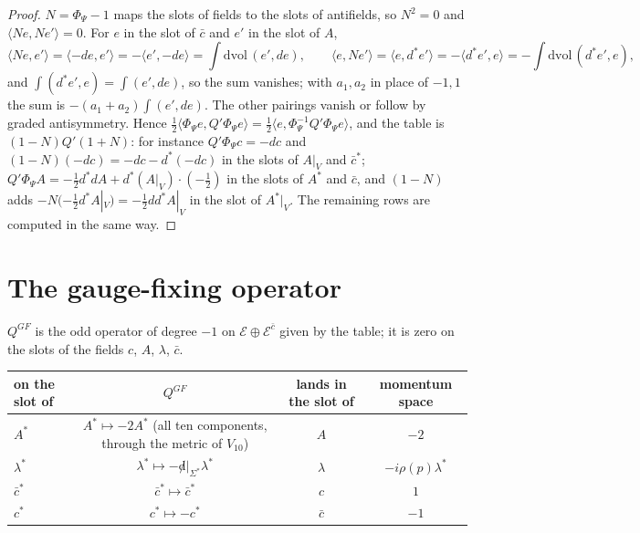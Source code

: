 \begin{proof}
$N=\Phi_\Psi-1$ maps the slots of fields to the slots of antifields, so $N^2=0$ and $\langle Ne,Ne'\rangle=0$. For $e$ in the slot of $\bar c$ and $e'$ in the slot of $A$,
\[
\langle Ne,e'\rangle=\langle-de,e'\rangle=-\langle e',-de\rangle=\int\mathrm{dvol}\,(e',de),\qquad \langle e,Ne'\rangle=\langle e,d^*e'\rangle=-\langle d^*e',e\rangle=-\int\mathrm{dvol}\,(d^*e',e),
\]
and $\int(d^*e',e)=\int(e',de)$, so the sum vanishes; with $a_1,a_2$ in place of $-1,1$ the sum is $-(a_1+a_2)\int(e',de)$. The other pairings vanish or follow by graded antisymmetry. Hence $\tfrac12\langle\Phi_\Psi e,Q'\Phi_\Psi e\rangle=\tfrac12\langle e,\Phi_\Psi^{-1}Q'\Phi_\Psi e\rangle$, and the table is $(1-N)Q'(1+N)$: for instance $Q'\Phi_\Psi c=-dc$ and $(1-N)(-dc)=-dc-d^*(-dc)$ in the slots of $A|_V$ and $\bar c^*$; $Q'\Phi_\Psi A=-\tfrac12d^*dA+d^*(A|_V)\cdot(-\tfrac12)$ in the slots of $A^*$ and $\bar c$, and $(1-N)$ adds $-N(-\tfrac12d^*A|_V)=-\tfrac12dd^*A|_V$ in the slot of $A^*|_V$. The remaining rows are computed in the same way.
\end{proof}

\section{The gauge-fixing operator}

\begin{definition}
\label{def:c3-qgf}
$Q^{GF}$ is the odd operator of degree $-1$ on $\mathscr E\oplus\mathscr E^{\bar c}$ given by the table; it is zero on the slots of the fields $c$, $A$, $\lambda$, $\bar c$.

\begin{tabular}{l|c|c|c}
on the slot of & $Q^{GF}$ & lands in the slot of & momentum space \\
\hline
$A^*$ & $A^*\mapsto-2A^*$ (all ten components, through the metric of $V_{10}$) & $A$ & $-2$ \\
$\lambda^*$ & $\lambda^*\mapsto-{\not d}|_{\Sigma^*}\lambda^*$ & $\lambda$ & $-i\rho(p)\lambda^*$ \\
$\bar c^*$ & $\bar c^*\mapsto\bar c^*$ & $c$ & $1$ \\
$c^*$ & $c^*\mapsto-c^*$ & $\bar c$ & $-1$ \\
\end{tabular}
\end{definition}

